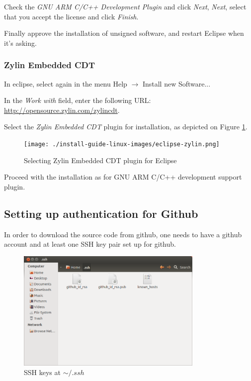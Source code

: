 \documentclass[a4paper, 10pt]{article}
\begin{document}
Check the \emph{GNU ARM C/C++ Development Plugin} and click \emph{Next},
\emph{Next}, select that you accept the license and click \emph{Finish}.

Finally approve the installation of unsigned software,
and restart Eclipse when it's asking.

\subsubsection{Zylin Embedded CDT}

In eclipse, select again in the menu Help $\rightarrow$ Install new Software...

In the \emph{Work with} field, enter the following URL:
\url{http://opensource.zylin.com/zylincdt}.

Select the \emph{Zylin Embedded CDT} plugin for installation,
as depicted on Figure \ref{fig:eclipse-zylin}.

    \begin{figure}[H]
    \centering
        \texttt{[image: ./install-guide-linux-images/eclipse-zylin.png]}
        \caption{Selecting Zylin Embedded CDT plugin for Eclipse}
        \label{fig:eclipse-zylin}
    \end{figure}

Proceed with the installation as for GNU ARM C/C++ development support plugin.

\subsection{Setting up authentication for Github}

In order to download the source code from github, one needs to
have a github account and at least one SSH key pair set up for github.

    \begin{figure}[H]
    \centering
        \includegraphics[width=0.8\textwidth]{./install-guide-linux-images/auth-copied.png}
        \caption{SSH keys at $ \sim/.ssh $ }
        \label{fig:auth-copied}
    \end{figure}
\end{document}
